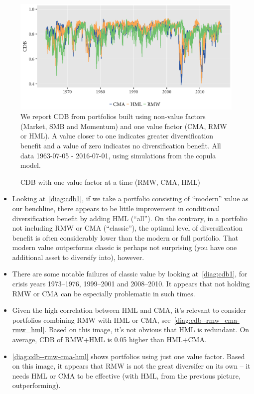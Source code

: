 \begin{figure}[H]
  \caption{CDB with one value factor at a time (RMW, CMA, HML)}
  \label{diag:cdb--rmw-cma-hml}
  \centering
  \begin{minipage}{\textwidth}
  \includegraphics[width=\textwidth]{graphics/cdb--rmw-cma-hml.png}
  \vspace{3mm}
  \footnotesize
  We report CDB from portfolios built using non-value factors (Market, SMB and Momentum) and one value factor (CMA, RMW or HML). A value closer to one indicates greater diversification benefit and a value of zero indicates no diversification benefit. All data 1963-07-05 - 2016-07-01, using simulations from the copula model.
  \end{minipage}
\end{figure}

\begin{itemize}
  \item Looking at~\autoref{diag:cdb1}, if we take a portfolio consisting of ``modern'' value as our benchline, there appears to be little improvement in conditional diversification benefit by adding HML (``all''). On the contrary, in a portfolio not including RMW or CMA (``classic''), the optimal level of diversification benefit is often considerably lower than the modern or full portfolio. That modern value outperforms classic is perhaps not surprising (you have one additional asset to diversify into), however.
  \item There are some notable failures of classic value by looking at~\autoref{diag:cdb1}, for crisis years 1973--1976, 1999--2001 and 2008--2010. It appears that not holding RMW or CMA can be especially problematic in such times.
  \item Given the high correlation between HML and CMA, it's relevant to consider portfolios combining RMW with HML or CMA, see~\autoref{diag:cdb--rmw_cma-rmw_hml}. Based on this image, it's not obvious that HML is redundant. On average, CDB of RMW+HML is 0.05 higher than HML+CMA.
  \item \autoref{diag:cdb--rmw-cma-hml} shows portfolios using just one value factor. Based on this image, it appears that RMW is not the great diversifer on its own -- it needs HML or CMA to be effective (with HML, from the previous picture, outperforming).
\end{itemize}
